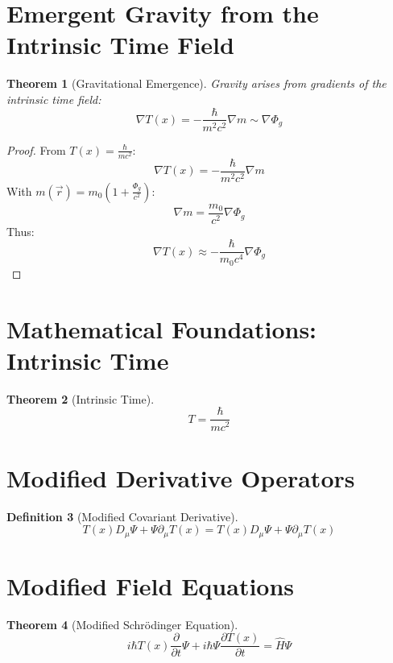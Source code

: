 \documentclass{article}
\newcommand{\Tfield}{T(x)}
\newcommand{\DcovT}[1]{\Tfield D_\mu #1 + #1 \partial_\mu \Tfield}
\newtheorem{theorem}{Theorem}[section]
\theoremstyle{definition}
\newtheorem{definition}[theorem]{Definition}
\theoremstyle{remark}
\begin{document}
	\section{Emergent Gravity from the Intrinsic Time Field}
	\begin{theorem}[Gravitational Emergence]
		Gravity arises from gradients of the intrinsic time field:
		\begin{equation}
			\nabla \Tfield = -\frac{\hbar}{m^2c^2} \nabla m \sim \nabla \Phi_g
		\end{equation}
	\end{theorem}
	
	\begin{proof}
		From \( \Tfield = \frac{\hbar}{mc^2} \):
		\begin{equation}
			\nabla \Tfield = -\frac{\hbar}{m^2c^2} \nabla m
		\end{equation}
		With \( m(\vec{r}) = m_0 (1 + \frac{\Phi_g}{c^2}) \):
		\begin{equation}
			\nabla m = \frac{m_0}{c^2} \nabla \Phi_g
		\end{equation}
		Thus:
		\begin{equation}
			\nabla \Tfield \approx -\frac{\hbar}{m_0 c^4} \nabla \Phi_g
		\end{equation}
	\end{proof}
	
	\section{Mathematical Foundations: Intrinsic Time}
	\begin{theorem}[Intrinsic Time]
		\begin{equation}
			T = \frac{\hbar}{mc^2}
		\end{equation}
	\end{theorem}
	
	\section{Modified Derivative Operators}
	\begin{definition}[Modified Covariant Derivative]
		\begin{equation}
			\DcovT{\Psi} = \Tfield D_\mu \Psi + \Psi \partial_\mu \Tfield
		\end{equation}
	\end{definition}
	
	\section{Modified Field Equations}
	\begin{theorem}[Modified Schrödinger Equation]
		\begin{equation}
			i\hbar \Tfield \frac{\partial}{\partial t} \Psi + i\hbar \Psi \frac{\partial \Tfield}{\partial t} = \hat{H} \Psi
		\end{equation}
	\end{theorem}
	
\end{document}
